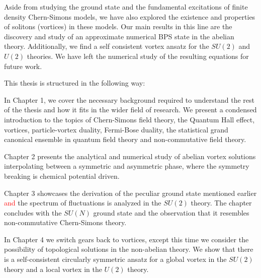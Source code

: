     Aside from studying the ground state and the fundamental excitations of finite density Chern-Simons models, we have also explored the existence and properties of solitons (vortices) in these models. Our main results in this line are the discovery and study of an approximate numerical BPS state in the abelian theory. Additionally, we find a self consistent vortex ansatz for the $SU(2)$ and $U(2)$ theories. We have left the numerical study of the resulting equations for future work.

    This thesis is structured in the following way:

    In Chapter 1, we cover the necessary background required to understand the rest of the thesis and how it fits in the wider field of research. We present a condensed introduction to the topics of Chern-Simons field theory, the Quantum Hall effect, vortices, particle-vortex duality, Fermi-Bose duality, the statistical grand canonical ensemble in quantum field theory and non-commutative field theory.

    Chapter 2 presents the analytical and numerical study of abelian vortex solutions interpolating between a symmetric and asymmetric phase, where the symmetry breaking is chemical potential driven.

    Chapter 3 showcases the derivation of the peculiar ground state mentioned earlier \textcolor{red}{and} the spectrum of fluctuations is analyzed in the $SU(2)$ theory. The chapter concludes with the $SU(N)$ ground state and the observation that it resembles non-commutative Chern-Simons theory.

    In Chapter 4 we switch gears back to vortices, except this time we consider the possibility of topological solutions in the non-abelian theory. We show that there is a self-consistent circularly symmetric ansatz for a global vortex in the $SU(2)$ theory and a local vortex in the $U(2)$ theory.



